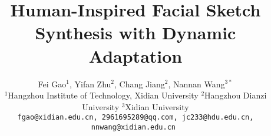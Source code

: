 \documentclass[10pt,twocolumn,letterpaper]{article}
\begin{document}
\title{Human-Inspired Facial Sketch Synthesis with Dynamic Adaptation}


\author{
	Fei Gao$^1$, 
	Yifan Zhu$^2$, 
	Chang Jiang$^2$, 
	Nannan Wang$^{3*}$ \\
	$^1$Hangzhou Institute of Technology, Xidian University 
	$^2$Hangzhou Dianzi University
	$^3$Xidian University  \\
	{\tt\small fgao@xidian.edu.cn, 
	2961695289@qq.com, 
	jc233@hdu.edu.cn,
	nnwang@xidian.edu.cn }
}

\end{document}
